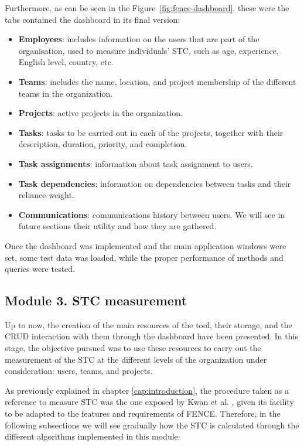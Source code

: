 Furthermore, as can be seen in the Figure~\ref{fig:fence-dashboard}, these were the tabs contained the dashboard in its final version:

\begin{itemize}
	\item \textbf{Employees}: includes information on the users that are part of the organisation, used to measure individuals’ STC, such as age, experience, English level, country, etc.
	\item \textbf{Teams}: includes the name, location, and project membership of the different teams in the organization.
	\item \textbf{Projects}: active projects in the organization.
	\item \textbf{Tasks}: tasks to be carried out in each of the projects, together with their description, duration, priority, and completion.
	\item \textbf{Task assignments}: information about task assignment to users.
	\item \textbf{Task dependencies}: information on dependencies between tasks and their reliance weight.
	\item \textbf{Communications}: communications history between users. We will see in future sections their utility and how they are gathered.
\end{itemize}

Once the dashboard was implemented and the main application windows were set, some test data was loaded, while the proper performance of methods and queries were tested.

\subsection{Module 3. STC measurement}
\label{sec:stc}

Up to now, the creation of the main resources of the tool, their storage, and the CRUD interaction with them through the dashboard have been presented. In this stage, the objective pursued was to use these resources to carry out the measurement of the STC at the different levels of the organization under consideration: users, teams, and projects.

As previously explained in chapter \ref{cap:introduction}, the procedure taken as a reference to measure STC was the one exposed by Kwan et al. \cite{kwan_weighted_2009,kwan_does_2011}, given its facility to be adapted to the features and requirements of FENCE. Therefore, in the following subsections we will see gradually how the STC is calculated through the different algorithms implemented in this module:

